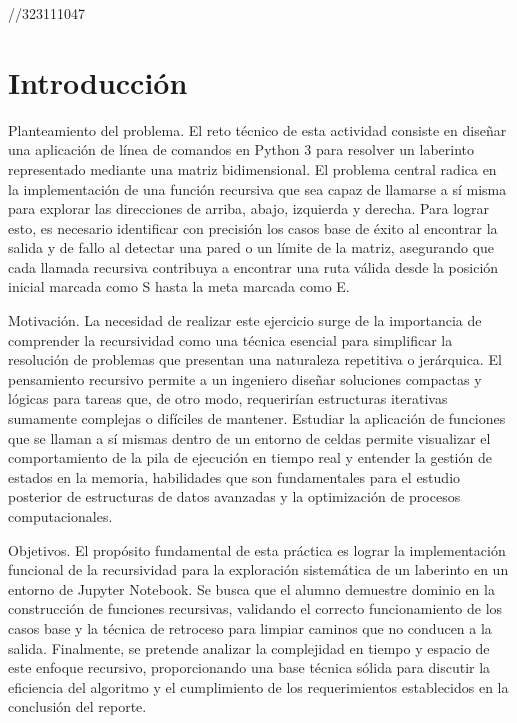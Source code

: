 //323111047

\section{Introducción}

Planteamiento del problema. El reto técnico de esta actividad consiste en diseñar una aplicación de línea de comandos en Python 3 para resolver un laberinto representado mediante una matriz bidimensional. El problema central radica en la implementación de una función recursiva que sea capaz de llamarse a sí misma para explorar las direcciones de arriba, abajo, izquierda y derecha. Para lograr esto, es necesario identificar con precisión los casos base de éxito al encontrar la salida y de fallo al detectar una pared o un límite de la matriz, asegurando que cada llamada recursiva contribuya a encontrar una ruta válida desde la posición inicial marcada como S hasta la meta marcada como E.

\vspace{0.4cm}

Motivación. La necesidad de realizar este ejercicio surge de la importancia de comprender la recursividad como una técnica esencial para simplificar la resolución de problemas que presentan una naturaleza repetitiva o jerárquica. El pensamiento recursivo permite a un ingeniero diseñar soluciones compactas y lógicas para tareas que, de otro modo, requerirían estructuras iterativas sumamente complejas o difíciles de mantener. Estudiar la aplicación de funciones que se llaman a sí mismas dentro de un entorno de celdas permite visualizar el comportamiento de la pila de ejecución en tiempo real y entender la gestión de estados en la memoria, habilidades que son fundamentales para el estudio posterior de estructuras de datos avanzadas y la optimización de procesos computacionales.

\vspace{0.4cm}

Objetivos. El propósito fundamental de esta práctica es lograr la implementación funcional de la recursividad para la exploración sistemática de un laberinto en un entorno de Jupyter Notebook. Se busca que el alumno demuestre dominio en la construcción de funciones recursivas, validando el correcto funcionamiento de los casos base y la técnica de retroceso para limpiar caminos que no conducen a la salida. Finalmente, se pretende analizar la complejidad en tiempo y espacio de este enfoque recursivo, proporcionando una base técnica sólida para discutir la eficiencia del algoritmo y el cumplimiento de los requerimientos establecidos en la conclusión del reporte.